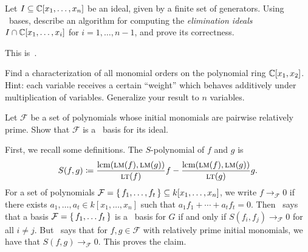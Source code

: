 \documentclass[letterpaper, 11pt, oneside]{book}
\begin{document}
\begin{exercise}
  Let $I \subseteq \mathbb{C}[x_{1}, \ldots, x_{n}]$ be an ideal, given by a finite set of generators.
  Using \Grobner\ bases, describe an algorithm for computing the \emph{elimination ideals} $I \cap \mathbb{C}[x_{1}, \ldots, x_{i}]$ for $i = 1, \ldots, n - 1$, and prove its correctness.
\end{exercise}
\begin{sol}
  This is~\cite[Chapter 3, \S 1, Theorem 2]{book:IVA}.
\end{sol}

\begin{exercise}
  Find a characterization of all monomial orders on the polynomial ring $\mathbb{C}[x_{1}, x_{2}]$.
  Hint: each variable receives a certain ``weight'' which behaves additively under multiplication of variables.
  Generalize your result to $n$ variables.
\end{exercise}
\begin{sol}
\end{sol}

\begin{exercise}
  Let $\mathcal{F}$ be a set of polynomials whose initial monomials are pairwise relatively prime.
  Show that $\mathcal{F}$ is a \Grobner\ basis for its ideal.
\end{exercise}
\begin{sol}
  First, we recall some definitions.
  The $S$-polynomial of $f$ and $g$ is
  \[
    S(f, g) \coloneqq \frac{\operatorname{lcm}(\operatorname{\textsc{lm}}(f), \operatorname{\textsc{lm}}(g))}{\operatorname{\textsc{lt}}(f)} f - \frac{\operatorname{lcm}(\operatorname{\textsc{lm}}(f), \operatorname{\textsc{lm}}(g))}{\operatorname{\textsc{lt}}(g)} g.
  \]
  For a set of polynomials $\mathcal{F} = \set{f_{1}, \ldots, f_{t}} \subseteq k[x_{1}, \ldots, x_{n}]$, we write $f \to_{\mathcal{F}} 0$ if there exists $a_{1}, \ldots, a_{t} \in k[x_{1}, \ldots, x_{n}]$ such that $a_{1} f_{1} + \cdots + a_{t} f_{t} = 0$.
  Then~\cite[Chapter 2, \S 9, Theorem 3]{book:IVA} says that a basis $\mathcal{F} = \set{f_{1}, \ldots f_{t}}$ is a \Grobner\ basis for $G$ if and only if $S(f_{i}, f_{j}) \to_{\mathcal{F}} 0$ for all $i \neq j$.
  But~\cite[Chapter 2, \S 9, Proposition 4]{book:IVA} says that for $f, g \in \mathcal{F}$ with relatively prime initial monomials, we have that $S(f, g) \to_{\mathcal{F}} 0$.
  This proves the claim.
\end{sol}

\printbibliography
\end{document}
